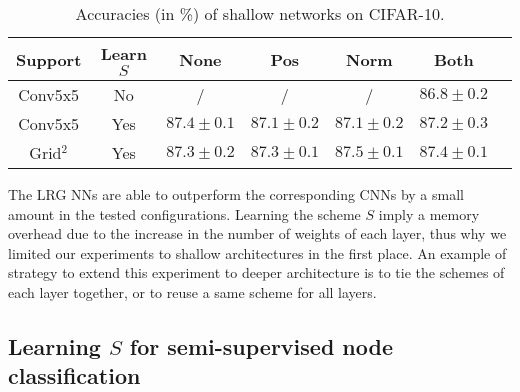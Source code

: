 \begin{table}[H]
  \caption{Accuracies (in \%) of shallow networks on CIFAR-10.}
  \begin{center}
    \bgroup
    \def\arraystretch{1.5}%
    \begin{tabular}{|c|c|c|c|c|c|c|}
      \hline
      Support & Learn $S$ & None & Pos & Norm & Both\\
      \hline
      \hline
      Conv5x5 & No & / & / & / & $86.8 \pm 0.2$\\
      \hline
      Conv5x5 & Yes & $87.4 \pm 0.1$ & $87.1 \pm 0.2$ & $87.1 \pm 0.2$ & $87.2 \pm 0.3$\\
      \hline
      Grid$^2$ & Yes & $87.3 \pm 0.2$ & $87.3 \pm 0.1$ & $87.5 \pm 0.1$ & $87.4 \pm 0.1$\\
      \hline
    \end{tabular}
    \egroup
  \end{center}
  \label{cifar}
\end{table}

The LRG NNs are able to outperform the corresponding CNNs by a small amount in the tested configurations. Learning the scheme $S$ imply a memory overhead due to the increase in the number of weights of each layer, thus why we limited our experiments to shallow architectures in the first place. An example of strategy to extend this experiment to deeper architecture is to tie the schemes of each layer together, or to reuse a same scheme for all layers.




\subsection{Learning $S$ for semi-supervised node classification}


